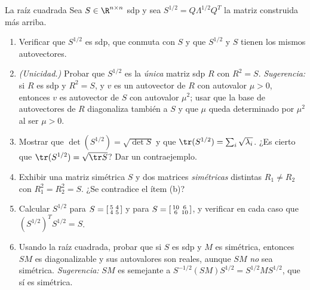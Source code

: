 \begin{entrega}{La raíz cuadrada}\label{ent:raiz}
Sea $S\in\R^{n\times n}$ sdp y sea $S^{1/2}=Q\Lambda^{1/2}Q^T$ la matriz
construida más arriba.
\begin{enumerate}[label=\textbf{(\alph*)},itemsep=3pt,topsep=4pt]
\item Verificar que $S^{1/2}$ es sdp, que conmuta con $S$ y que
$S^{1/2}$ y $S$ tienen los mismos autovectores.

\item \emph{(Unicidad.)} Probar que $S^{1/2}$ es la \emph{única} matriz sdp
$R$ con $R^2=S$. \emph{Sugerencia:} si $R$ es sdp y $R^2=S$, y $v$ es un
autovector de $R$ con autovalor $\mu>0$, entonces $v$ es autovector de $S$ con
autovalor $\mu^2$; usar que la base de autovectores de $R$ diagonaliza también
a $S$ y que $\mu$ queda determinado por $\mu^2$ al ser $\mu>0$.

\item Mostrar que $\det(S^{1/2}) = \sqrt{\det S}$ y que
$\tr(S^{1/2}) = \sum_i\sqrt{\lambda_i}$. ¿Es cierto que
$\tr(S^{1/2})=\sqrt{\tr S}$? Dar un contraejemplo.

\item Exhibir una matriz simétrica $S$ y dos matrices \emph{simétricas}
distintas $R_1\neq R_2$ con $R_1^2=R_2^2=S$. ¿Se contradice el ítem (b)?

\item Calcular $S^{1/2}$ para $S=\begin{bsmallmatrix} 5 & 4\\ 4 &
5\end{bsmallmatrix}$ y para $S=\begin{bsmallmatrix} 10 & 6\\ 6 &
10\end{bsmallmatrix}$, y verificar en cada caso que
$(S^{1/2})^TS^{1/2}=S$.

\item Usando la raíz cuadrada, probar que si $S$ es sdp y $M$ es simétrica,
entonces $SM$ es diagonalizable y sus autovalores son reales, aunque $SM$
\emph{no} sea simétrica. \emph{Sugerencia:} $SM$ es semejante a
$S^{-1/2}(SM)S^{1/2} = S^{1/2}MS^{1/2}$, que sí es simétrica.
\end{enumerate}

\medskip
{}
\end{entrega}

